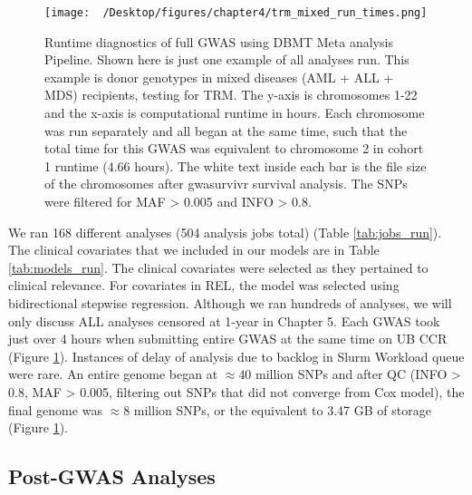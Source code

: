 \documentclass[]{DissertateOSU}
\begin{document}

\begin{figure}
    \centering
    \texttt{[image: ~/Desktop/figures/chapter4/trm\_mixed\_run\_times.png]}
    \caption[Runtime diagnostics of full GWAS using DBMT Meta analysis Pipeline.]{Runtime diagnostics of full GWAS using DBMT Meta analysis Pipeline. Shown here is just one example of all analyses run. This example is donor genotypes in mixed diseases (AML + ALL + MDS) recipients, testing for TRM. The y-axis is chromosomes 1-22 and the x-axis is computational runtime in hours. Each chromosome was run separately and all began at the same time, such that the total time for this GWAS was equivalent to chromosome 2 in cohort 1 runtime (4.66 hours). The white text inside each bar is the file size of the chromosomes after gwasurvivr survival analysis. The SNPs were filtered for MAF > 0.005 and INFO > 0.8.}
    \label{fig:run_times}  
\end{figure}

We ran 168 different analyses (504 analysis jobs total) (Table
\ref{tab:jobs_run}). The clinical covariates that we included in our
models are in Table \ref{tab:models_run}. The clinical covariates were
selected as they pertained to clinical relevance. For covariates in REL,
the model was selected using bidirectional stepwise regression. Although
we ran hundreds of analyses, we will only discuss ALL analyses censored
at 1-year in Chapter 5. Each GWAS took just over 4 hours when submitting
entire GWAS at the same time on UB CCR (Figure \ref{fig:run_times}).
Instances of delay of analysis due to backlog in Slurm Workload queue
were rare. An entire genome began at \(\approx 40\) million SNPs and
after QC (INFO \textgreater{} 0.8, MAF \textgreater{} 0.005, filtering
out SNPs that did not converge from Cox model), the final genome was
\(\approx 8\) million SNPs, or the equivalent to 3.47 GB of storage
(Figure \ref{fig:run_times}).

\subsection{Post-GWAS Analyses}\label{post-gwas-analyses}
\end{document}
